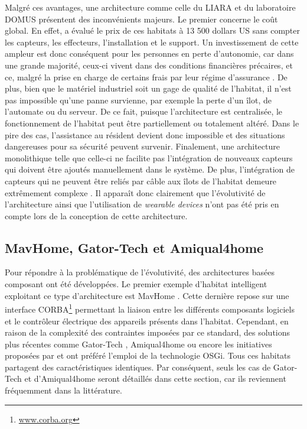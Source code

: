 Malgré ces avantages, une architecture comme celle du \acs{LIARA} et du laboratoire \acs{DOMUS} présentent des inconvénients majeurs. Le premier concerne le coût global. En effet, \cite{Plantevin2018a} a évalué le prix de ces habitats à 13 500 dollars US sans compter les capteurs, les effecteurs, l'installation et le support. Un investissement de cette ampleur est donc conséquent pour les personnes en perte d'autonomie, car dans une grande majorité, ceux-ci vivent dans des conditions financières précaires, et ce, malgré la prise en charge de certains frais par leur régime d'assurance \citep{AlzheimersAssociation2018}. De plus, bien que le matériel industriel soit un gage de qualité de l'habitat, il n'est pas impossible qu'une panne survienne, par exemple la perte d'un îlot, de l'automate ou du serveur. De ce fait, puisque l'architecture est centralisée, le fonctionnement de l'habitat peut être partiellement ou totalement altéré. Dans le pire des cas, l'assistance au résident devient donc impossible et des situations dangereuses pour sa sécurité peuvent survenir. Finalement, une architecture monolithique telle que celle-ci ne facilite pas l'intégration de nouveaux capteurs qui doivent être ajoutés manuellement dans le système. De plus, l'intégration de capteurs qui ne peuvent être reliés par câble aux îlots de l'habitat demeure extrêmement complexe \citep{Plantevin2018a}. Il apparaît donc clairement que l'évolutivité de l'architecture ainsi que l'utilisation de \textit{wearable devices} n'ont pas été pris en compte lors de la conception de cette architecture.

\subsection{MavHome, Gator-Tech et Amiqual4home}

Pour répondre à la problématique de l'évolutivité, des architectures basées composant ont été développées. Le premier exemple d'habitat intelligent exploitant ce type d'architecture est MavHome \citep{DJCook2003}. Cette dernière repose sur une interface \ac{CORBA}\footnote{\url{www.corba.org}} permettant la liaison entre les différents composants logiciels et le contrôleur électrique des appareils présents dans l'habitat. Cependant, en raison de la complexité des contraintes imposées par ce standard, des solutions plus récentes comme Gator-Tech \citep{Helal2005}, Amiqual4home \citep{Lago2017} ou encore les initiatives proposées par \cite{Novak2011} et \cite{Cheng2012} ont préféré l'emploi de la technologie \ac{OSGi}. Tous ces habitats partagent des caractéristiques identiques. Par conséquent, seuls les cas de Gator-Tech et d'Amiqual4home seront détaillés dans cette section, car ils reviennent fréquemment dans la littérature.

